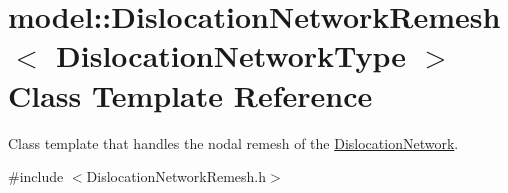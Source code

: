 \hypertarget{classmodel_1_1_dislocation_network_remesh}{}\section{model\+:\+:Dislocation\+Network\+Remesh$<$ Dislocation\+Network\+Type $>$ Class Template Reference}
\label{classmodel_1_1_dislocation_network_remesh}


Class template that handles the nodal remesh of the \hyperlink{classmodel_1_1_dislocation_network}{Dislocation\+Network}.  




{\ttfamily \#include $<$Dislocation\+Network\+Remesh.\+h$>$}

